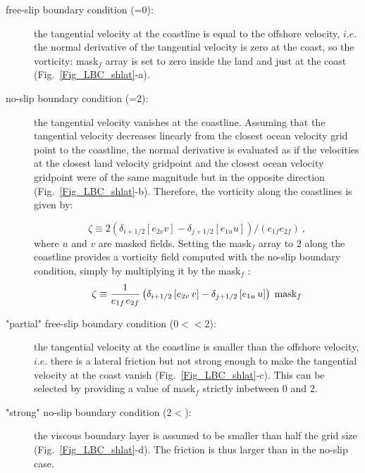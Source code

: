 \documentclass[NEMO_book]{subfiles}
\begin{document}
\begin{description}

\item[free-slip boundary condition (=0): ]  the tangential velocity at the 
coastline is equal to the offshore velocity, $i.e.$ the normal derivative of the 
tangential velocity is zero at the coast, so the vorticity: mask$_{f}$ array is set 
to zero inside the land and just at the coast (Fig.~\ref{Fig_LBC_shlat}-a).

\item[no-slip boundary condition (=2): ] the tangential velocity vanishes 
at the coastline. Assuming that the tangential velocity decreases linearly from 
the closest ocean velocity grid point to the coastline, the normal derivative is 
evaluated as if the velocities at the closest land velocity gridpoint and the closest 
ocean velocity gridpoint were of the same magnitude but in the opposite direction 
(Fig.~\ref{Fig_LBC_shlat}-b). Therefore, the vorticity along the coastlines is given by: 

\begin{equation*}
\zeta \equiv 2 \left(\delta_{i+1/2} \left[e_{2v} v \right] - \delta_{j+1/2} \left[e_{1u} u \right] \right) / \left(e_{1f} e_{2f} \right) \ ,
\end{equation*}
where $u$ and $v$ are masked fields. Setting the mask$_{f}$ array to $2$ along 
the coastline provides a vorticity field computed with the no-slip boundary condition, 
simply by multiplying it by the mask$_{f}$ :
\begin{equation} \label{Eq_lbc_bbbb}
\zeta \equiv \frac{1}{e_{1f} {\kern 1pt}e_{2f} }\left( {\delta _{i+1/2} 
\left[ {e_{2v} \,v} \right]-\delta _{j+1/2} \left[ {e_{1u} \,u} \right]} 
\right)\;\mbox{mask}_f 
\end{equation}

\item["partial" free-slip boundary condition (0$<$$<$2): ] the tangential 
velocity at the coastline is smaller than the offshore velocity, $i.e.$ there is a lateral 
friction but not strong enough to make the tangential velocity at the coast vanish 
(Fig.~\ref{Fig_LBC_shlat}-c). This can be selected by providing a value of mask$_{f}$ 
strictly inbetween $0$ and $2$.

\item["strong" no-slip boundary condition (2$<$): ] the viscous boundary 
layer is assumed to be smaller than half the grid size (Fig.~\ref{Fig_LBC_shlat}-d). 
The friction is thus larger than in the no-slip case.

\end{description}
\end{document}
